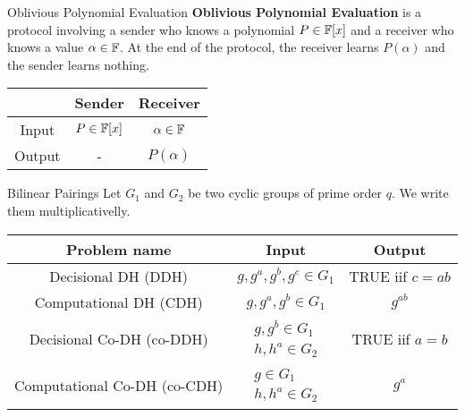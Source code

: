 \begin{frame}{Oblivious Polynomial Evaluation}
\textbf{Oblivious Polynomial Evaluation} is a protocol involving a sender who knows a polynomial $P \in {\mathbb F}[x]$ and a receiver who knows a value $\alpha \in {\mathbb F}$. At the end of the protocol, the receiver learns $P(\alpha)$ and the sender learns nothing.


\begin{center}
\begin{tabular}{|c|c|c|}
\hline
             &    Sender & Receiver \\ \hline
    Input    &    $P \in {\mathbb F}[x]$ & $\alpha \in {\mathbb F}$ \\ \hline
    Output   &    -    &    $P(\alpha)$ \\ \hline

\end{tabular}
\end{center}

\end{frame}

\begin{frame}{Bilinear Pairings}
Let $G_1$ and $G_2$ be two cyclic groups of prime order $q$. We write them multiplicativelly.
\begin{center}
\small
\begin{tabular}{|c|c|c|}
\hline
Problem name & Input & Output \\
\hline
Decisional DH (DDH) & $g,g^a,g^b,g^c \in G_1$ & TRUE iif $c=ab$ \\ \hline
Computational DH (CDH) & $g,g^a,g^b \in G_1$ &  $g^{ab}$  \\ \hline
Decisional Co-DH (co-DDH) & 
        $\begin{array}{r}
        g,g^b \in G_1 \\ 
        h, h^a \in G_2
        \end{array}$ & TRUE iif $a=b$ \\ \hline
Computational Co-DH (co-CDH) & 
        $\begin{array}{r}
        g \in G_1 \\
        h, h^a \in G_2
        \end{array}$ & $g^a$ \\ \hline

\end{tabular}
\end{center}
\end{frame}

